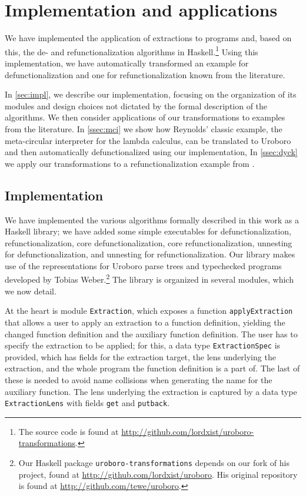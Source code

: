 \chapter{Implementation and applications}
\label{ch:impl}

We have implemented the application of extractions to programs and, based on this, the de- and refunctionalization algorithms in Haskell.\footnote{The source code is found at \url{http://github.com/lordxist/uroboro-transformations}.} Using this implementation, we have automatically transformed an example for defunctionalization and one for refunctionalization known from the literature.

In \autoref{sec:impl}, we describe our implementation, focusing on the organization of its modules and design choices not dictated by the formal description of the algorithms. We then consider applications of our transformations to examples from the literature. In \autoref{ssec:mci} we show how Reynolds' classic example, the meta-circular interpreter for the lambda calculus\citep{reynolds72definitional}, can be translated to Uroboro and then automatically defunctionalized using our implementation, In \autoref{ssec:dyck} we apply our transformations to a refunctionalization example from \citet{danvy09refunctionalization}.

\section{Implementation}
\label{sec:impl}

We have implemented the various algorithms formally described in this work as a Haskell library; we have added some simple executables for defunctionalization, refunctionalization, core defunctionalization, core refunctionalization, unnesting for defunctionalization, and unnesting for refunctionalization. Our library makes use of the representations for Uroboro parse trees and typechecked programs developed by Tobias Weber.\footnote{Our Haskell package \texttt{uroboro-transformations} depends on our fork of his project, found at \url{http://github.com/lordxist/uroboro}. His original repository is found at \url{http://github.com/tewe/uroboro}.} The library is organized in several modules, which we now detail.

At the heart is module \texttt{Extraction}, which exposes a function \texttt{applyExtraction} that allows a user to apply an extraction to a function definition, yielding the changed function definition and the auxiliary function definition. The user has to specify the extraction to be applied; for this, a data type \texttt{ExtractionSpec} is provided, which has fields for the extraction target, the lens underlying the extraction, and the whole program the function definition is a part of. The last of these is needed to avoid name collisions when generating the name for the auxiliary function. The lens underlying the extraction is captured by a data type \texttt{ExtractionLens} with fields \texttt{get} and \texttt{putback}.

